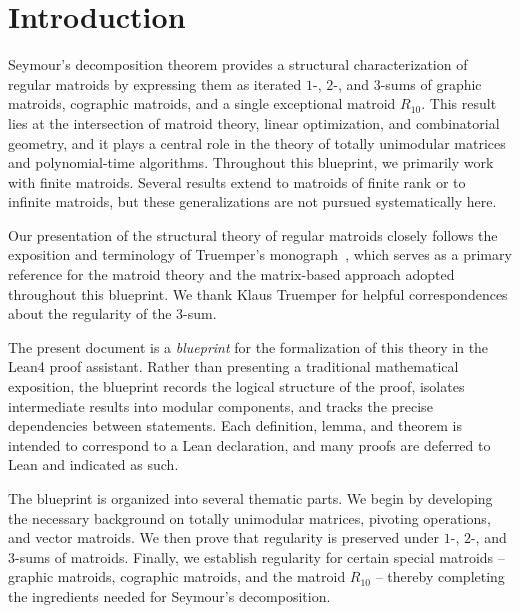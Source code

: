 \section{Introduction}

Seymour's decomposition theorem provides a structural characterization of regular matroids by expressing them as iterated $1$-, $2$-, and $3$-sums of graphic matroids, cographic matroids, and a single exceptional matroid $R_{10}$.  
This result lies at the intersection of matroid theory, linear optimization, and combinatorial geometry, and it plays a central role in the theory of totally unimodular matrices and polynomial-time algorithms. Throughout this blueprint, we primarily work with finite matroids. Several results extend to matroids of finite rank or to infinite matroids, but these generalizations are not pursued systematically here.

Our presentation of the structural theory of regular matroids closely follows the exposition and
terminology of Truemper's monograph~\cite{Truemper}, which serves as a primary reference for the
matroid theory and the matrix-based approach adopted throughout this blueprint. We thank Klaus Truemper for helpful correspondences about the regularity of the 3-sum.

The present document is a \emph{blueprint} for the formalization of this theory in the Lean4 proof assistant.  
Rather than presenting a traditional mathematical exposition, the blueprint records the logical structure of the proof, isolates intermediate results into modular components, and tracks the precise dependencies between statements.  
Each definition, lemma, and theorem is intended to correspond to a Lean declaration, and many proofs are deferred to Lean and indicated as such.


The blueprint is organized into several thematic parts.  
We begin by developing the necessary background on totally unimodular matrices, pivoting operations, and vector matroids.  
We then prove that regularity is preserved under $1$-, $2$-, and $3$-sums of matroids.  
Finally, we establish regularity for certain special matroids -- graphic matroids, cographic matroids, and the matroid $R_{10}$ -- thereby completing the ingredients needed for Seymour's decomposition.